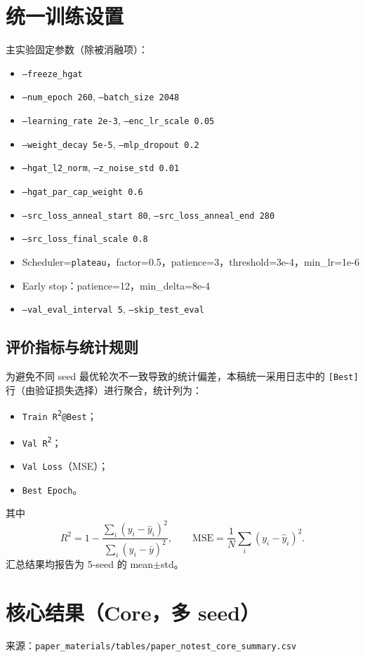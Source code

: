 \documentclass[12pt,a4paper]{ctexart}
\begin{document}
\section{统一训练设置}
主实验固定参数（除被消融项）：
\begin{itemize}
  \item \texttt{--freeze\_hgat}
  \item \texttt{--num\_epoch 260}, \texttt{--batch\_size 2048}
  \item \texttt{--learning\_rate 2e-3}, \texttt{--enc\_lr\_scale 0.05}
  \item \texttt{--weight\_decay 5e-5}, \texttt{--mlp\_dropout 0.2}
  \item \texttt{--hgat\_l2\_norm}, \texttt{--z\_noise\_std 0.01}
  \item \texttt{--hgat\_par\_cap\_weight 0.6}
  \item \texttt{--src\_loss\_anneal\_start 80}, \texttt{--src\_loss\_anneal\_end 280}
  \item \texttt{--src\_loss\_final\_scale 0.8}
  \item Scheduler=\texttt{plateau}，factor=0.5，patience=3，threshold=3e-4，min\_lr=1e-6
  \item Early stop：patience=12，min\_delta=8e-4
  \item \texttt{--val\_eval\_interval 5}, \texttt{--skip\_test\_eval}
\end{itemize}

\subsection{评价指标与统计规则}
为避免不同 seed 最优轮次不一致导致的统计偏差，本稿统一采用日志中的 \texttt{[Best]} 行（由验证损失选择）进行聚合，统计列为：
\begin{itemize}
  \item \texttt{Train R\textsuperscript{2}@Best}；
  \item \texttt{Val R\textsuperscript{2}}；
  \item \texttt{Val Loss}（MSE）；
  \item \texttt{Best Epoch}。
\end{itemize}
其中
\begin{equation}
R^2 = 1-\frac{\sum_i (y_i-\hat{y}_i)^2}{\sum_i (y_i-\bar{y})^2},\qquad
\text{MSE} = \frac{1}{N}\sum_i (y_i-\hat{y}_i)^2 .
\end{equation}
汇总结果均报告为 5-seed 的 mean$\pm$std。

\section{核心结果（Core，多 seed）}
来源：\texttt{paper\_materials/tables/paper\_notest\_core\_summary.csv}
\end{document}
